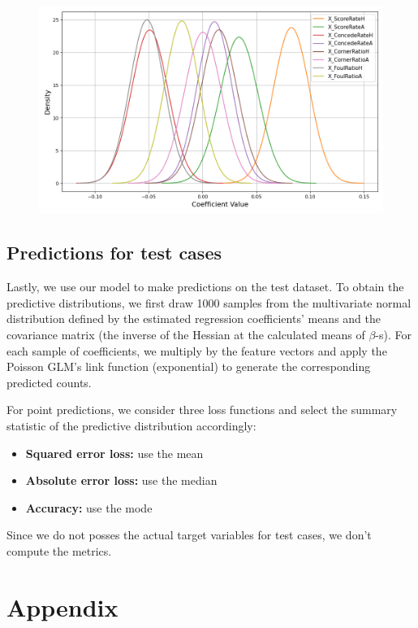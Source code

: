 \documentclass[9pt]{IEEEtran}
\begin{document}
\begin{figure}[h]
\centering
\includegraphics[width=1\columnwidth]{figures/approximation.png}
\caption{}
\label{fig:approx}
\end{figure}

\subsection{Predictions for test cases}
Lastly, we use our model to make predictions on the test dataset. To 
obtain the predictive distributions, we first draw 1000 samples from the
 multivariate normal distribution defined by the estimated regression 
 coefficients’ means and the covariance matrix (the inverse of the Hessian
 at the calculated means of $\beta$-s). For each sample of coefficients, 
 we multiply by the feature vectors and apply the Poisson GLM’s link 
 function (exponential) to generate the corresponding predicted counts.

For point predictions, we consider three loss functions and select the summary statistic of the predictive distribution accordingly:
\begin{itemize}
    \item \textbf{Squared error loss:} use the mean
    \item \textbf{Absolute error loss:} use the median
    \item \textbf{Accuracy:} use the mode
\end{itemize}

Since we do not posses the actual target variables for test cases, we 
don't compute the metrics. 



\section{Appendix}





\end{document}
